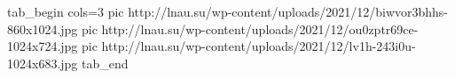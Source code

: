  
 
 
 
 

\ifcmt
  tab_begin cols=3
     pic http://lnau.su/wp-content/uploads/2021/12/biwvor3bhhs-860x1024.jpg
		 pic http://lnau.su/wp-content/uploads/2021/12/ou0zptr69ce-1024x724.jpg
		 pic http://lnau.su/wp-content/uploads/2021/12/lv1h-243i0u-1024x683.jpg
  tab_end
\fi
